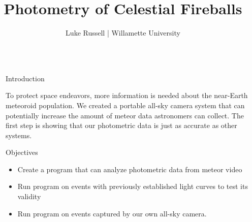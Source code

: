 \documentclass[final]{beamer}
\title{Photometry of Celestial Fireballs} %
\author{Luke Russell | Willamette University} %
\newlength{\sepwid}
\newlength{\twocolwid}
\begin{document}

\setlength{\belowcaptionskip}{0ex} %
\setlength\belowdisplayshortskip{2ex} %

\begin{frame}[t] %

\begin{columns}[t] %

\begin{column}{\sepwid}\end{column} %

\begin{column}{\twocolwid} %



\begin{block}{Introduction}

To protect space endeavors, more information is needed about the near-Earth meteoroid population. We created a portable all-sky camera system that can potentially increase the amount of meteor data astronomers can collect. The first step is showing that our photometric data is just as accurate as other systems.

\end{block}

\begin{alertblock}{Objectives}

 \begin{itemize}
\item Create a program that can analyze photometric data from meteor video
\item Run program on events with previously established light curves to test its validity
\item Run program on events captured by our own all-sky camera. 
\end{itemize}


\end{alertblock}
\end{column}
\end{columns}
\end{frame}
\end{document}
